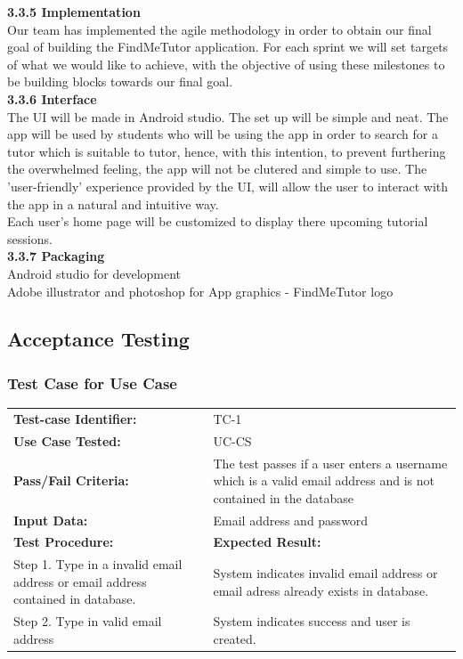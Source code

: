 \documentclass[12pt]{article}
\begin{document}
{\textbf{3.3.5 Implementation}\\
Our team has implemented the agile methodology in order to obtain our final goal of building the FindMeTutor application. For each sprint we will set targets of what we would like to achieve, with the objective of using these milestones to be building blocks towards our final goal.
\\\textbf{3.3.6 Interface}\\
The UI will be made in Android studio. The set up will be simple and neat. The app will be used by students who will be using the app in order to search for a tutor which is suitable to tutor, hence, with this intention, to prevent furthering the overwhelmed feeling, the app will not be clutered and simple to use. The 'user-friendly' experience provided by the UI, will allow the user to interact with the app in a natural and intuitive way. \\
Each user's home page will be customized to display there upcoming tutorial sessions.\\
\textbf{3.3.7 Packaging}\\
Android studio for development\\
Adobe illustrator and photoshop for App graphics - FindMeTutor logo\\
}


\subsection{Acceptance Testing}

\subsubsection{Test Case for Use Case}
\begin{tabular}{| p{8cm} | p{8cm} |} \hline
	\textbf{Test-case Identifier:}& TC-1\\
	\textbf{Use Case Tested:}& UC-CS\\
	\textbf{Pass/Fail Criteria:}& The test passes if a user enters a username which is a valid email address
	and is not contained in the database\\
	\textbf{Input Data:}& Email address and password\\\hline
	\textbf{Test Procedure:}& \textbf{Expected Result:} \\\hline
	Step 1. Type in a invalid email address or email address contained in database.
	& System indicates invalid email address or email adress already exists in database.\\
	Step 2. Type in valid email address  & System indicates success and user is created.\\\hline
\end{tabular}
\\
\end{document}
